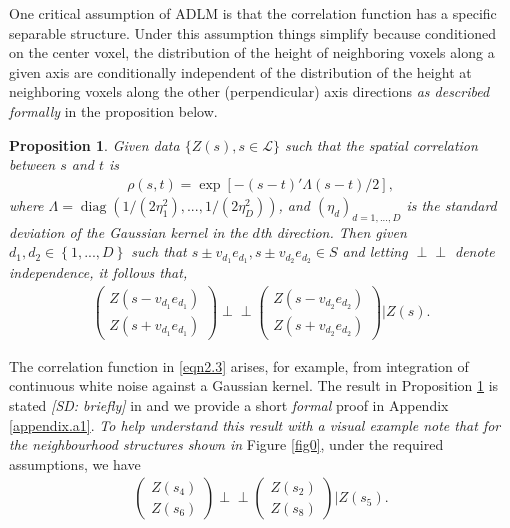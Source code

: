 \documentclass{article}
\newtheorem{Proposition}[theorem]{Proposition}
\newcommand{\indep}{\perp \!\!\! \perp}
\newcommand{\sdcom}[1]{\textit{\color{red} [SD: #1]}}
\newcommand{\nt}[1]{\textit{\color{red} #1}}
\begin{document}
One critical assumption of ADLM is that the correlation function has a specific separable structure. Under this assumption things simplify because conditioned on the center voxel, the distribution of the height of neighboring voxels along a given axis are conditionally independent of the distribution of the height at neighboring voxels along the other (perpendicular) axis directions \nt{as described formally} in the proposition below.

\begin{Proposition}
\label{prop1}
Given data $\{Z(s), s\in \mathcal{L}\}$ such that the spatial correlation between $s$ and $t$ is
\begin{align}
\rho(s,t) = \exp[-(s-t)'\Lambda(s-t)/2] \label{eqn2.3},
\end{align}
where $\Lambda = \operatorname{diag}(1/(2\eta_1^2),..., 1/(2\eta_D^2))$, and $(\eta_d)_{d=1,...,D}$ is the standard deviation of the Gaussian kernel in the $d$th direction. \nt{Then given $d_1, d_2\in\left\{1,...,D\right\}$ such that $s\pm v_{d_1}e_{d_1}, s\pm v_{d_2}e_{d_2} \in S$ and letting $\indep$ denote independence, it follows that,}
\begin{align*}
    \begin{pmatrix}
    Z(s-v_{d_1}e_{d_1}) \\
    Z(s+v_{d_1}e_{d_1})           
    \end{pmatrix}
    \indep 
    \begin{pmatrix}
    Z(s-v_{d_2}e_{d_2}) \\
    Z(s+v_{d_2}e_{d_2})           
    \end{pmatrix}\bigg| Z(s).
\end{align*}
\end{Proposition}
The correlation function in \eqref{eqn2.3} arises, for example, from integration of continuous white noise against a Gaussian kernel. The result in Proposition \ref{prop1} is stated \sdcom{briefly} in \cite{taylor2007maxima} and we provide a short \nt{formal} proof in Appendix \ref{appendix.a1}. \nt{To help understand this result with a visual example note that for the neighbourhood structures shown in} Figure \ref{fig0}, under the required assumptions, we have
\begin{align*}
\begin{pmatrix}
Z(s_4) \\
Z(s_6)           
\end{pmatrix}
\indep 
\begin{pmatrix}
Z(s_2) \\
Z(s_8)           
\end{pmatrix}\bigg| Z(s_5).
\end{align*}
\end{document}
